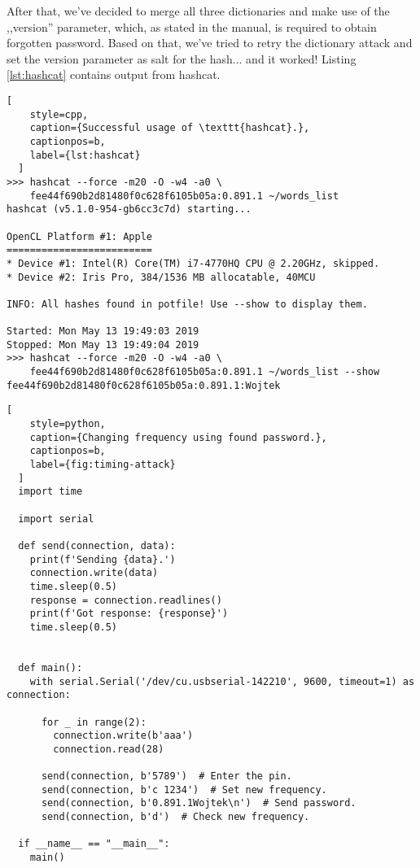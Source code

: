 After that, we've decided to merge all three dictionaries and make use of the ,,version'' parameter, which, as stated in the manual, is required to obtain forgotten password. Based on that, we've tried to retry the dictionary attack and set the version parameter as salt for the hash... and it worked! Listing \ref{lst:hashcat} contains output from hashcat.

\begin{minipage}{\linewidth}
  \begin{lstlisting}[
    style=cpp,
    caption={Successful usage of \texttt{hashcat}.},
    captionpos=b,
    label={lst:hashcat}
  ]
>>> hashcat --force -m20 -O -w4 -a0 \
    fee44f690b2d81480f0c628f6105b05a:0.891.1 ~/words_list
hashcat (v5.1.0-954-gb6cc3c7d) starting...

OpenCL Platform #1: Apple
=========================
* Device #1: Intel(R) Core(TM) i7-4770HQ CPU @ 2.20GHz, skipped.
* Device #2: Iris Pro, 384/1536 MB allocatable, 40MCU

INFO: All hashes found in potfile! Use --show to display them.

Started: Mon May 13 19:49:03 2019
Stopped: Mon May 13 19:49:04 2019
>>> hashcat --force -m20 -O -w4 -a0 \
    fee44f690b2d81480f0c628f6105b05a:0.891.1 ~/words_list --show
fee44f690b2d81480f0c628f6105b05a:0.891.1:Wojtek
  \end{lstlisting}
  \end{minipage}




\begin{minipage}{\linewidth}
  \begin{lstlisting}[
    style=python,
    caption={Changing frequency using found password.},
    captionpos=b,
    label={fig:timing-attack}
  ]
  import time

  import serial

  def send(connection, data):
    print(f'Sending {data}.')
    connection.write(data)
    time.sleep(0.5)
    response = connection.readlines()
    print(f'Got response: {response}')
    time.sleep(0.5)


  def main():
    with serial.Serial('/dev/cu.usbserial-142210', 9600, timeout=1) as connection:

      for _ in range(2):
        connection.write(b'aaa')
        connection.read(28)

      send(connection, b'5789')  # Enter the pin.
      send(connection, b'c 1234')  # Set new frequency.
      send(connection, b'0.891.1Wojtek\n')  # Send password.
      send(connection, b'd')  # Check new frequency.

  if __name__ == "__main__":
    main()
  \end{lstlisting}
\end{minipage}

